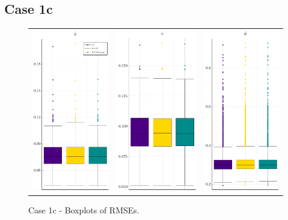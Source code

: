 \subsection{Case 1c}
\begin{figure}[ht]
		\centering
		\begin{tabular}[b]{c c c}
		\includegraphics[width=.3\textwidth]{Figures/1c/RMSE_b.pdf} & \includegraphics[width=.3\textwidth]{Figures/1c/RMSE_a.pdf} & \includegraphics[width=.3\textwidth]{Figures/1c/RMSE_t.pdf}
	\end{tabular}
\caption{Case 1c - Boxplots of RMSEs.}
	\label{fig:bpRMSE1c}
\end{figure}
